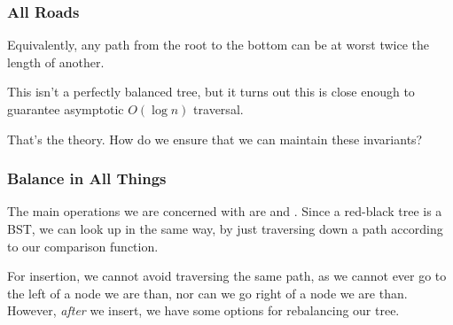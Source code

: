 \documentclass[aspectratio=169, handout]{beamer}
\begin{document}
\begin{frame}
  \frametitle{All Roads}


  \pause
  \vspace{\fill}

  Equivalently, any path from the root to the bottom can be at worst twice the
  length of another.

  \pause
  \vspace{\fill}

  This isn't a perfectly balanced tree, but it turns out this is close enough to guarantee
  asymptotic $O(\log n)$ traversal.

  \pause
  \vspace{\fill}

  That's the theory. How do we ensure that we can maintain these invariants?
\end{frame}


\begin{frame}
  \frametitle{Balance in All Things}

  The main operations we are concerned with are  and . Since a
  red-black tree is a BST, we can look up in the same way, by just traversing down a path
  according to our comparison function.

  \pause
  \vspace{\fill}

  For insertion, we cannot avoid traversing the same path, as we cannot ever go to the
  left of a node we are  than, nor can we go right of a node we are
   than. However, \textit{after} we insert, we have some options for
  rebalancing our tree.

  \pause
  \vspace{\fill}

\end{frame}
\end{document}
